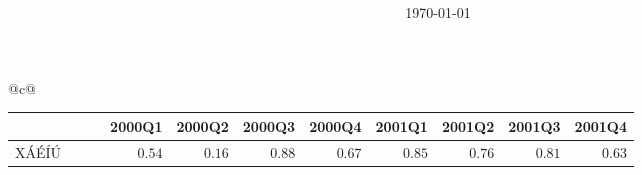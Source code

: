 \documentclass[10pt,letterpaper]{article}
\title{{\mylcmss\bfseries }}
\author{}
\date{\today}
\begin{document}
\pagestyle{myheadings}





\centering


\begin{tabular}[t]{@{\hspace*{-3pt}}c@{ }}
\\[7pt]
{
\renewcommand{\arraystretch}{1.15}
\begin{tabular}{lllrrrrrrrr}
\hline
&&&\multicolumn{1}{c}{{2000Q1}}&\multicolumn{1}{c}{{2000Q2}}&\multicolumn{1}{c}{{2000Q3}}&\multicolumn{1}{c}{{2000Q4}}&\multicolumn{1}{c}{{2001Q1}}&\multicolumn{1}{c}{{2001Q2}}&\multicolumn{1}{c}{{2001Q3}}&\multicolumn{1}{c}{{2001Q4}}\\
\hline
XÁÉÍÚ & ~ &  & {\ensuremath{0.54}} & {\ensuremath{0.16}} & {\ensuremath{0.88}} & {\ensuremath{0.67}} & {\ensuremath{0.85}} & {\ensuremath{0.76}} & {\ensuremath{0.81}} & {\ensuremath{0.63}} \\
\hline
\end{tabular}}
\end{tabular}%
\end{document}
